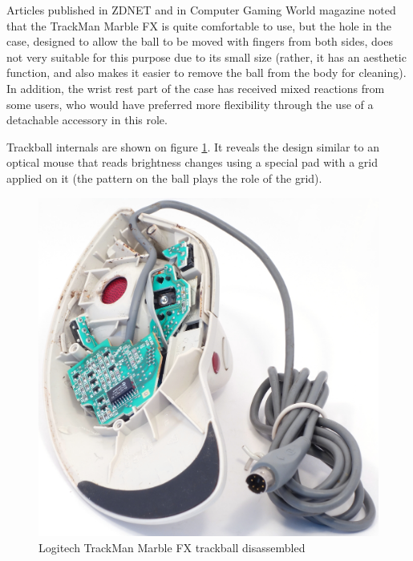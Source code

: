 \documentclass[11pt, a4paper]{article}
\begin{document}
Articles published in ZDNET \cite{zdnet} and in Computer Gaming World magazine \cite{gaming} noted that the TrackMan Marble FX is quite comfortable to use, but the hole in the case, designed to allow the ball to be moved with fingers from both sides, does not very suitable for this purpose due to its small size (rather, it has an aesthetic function, and also makes it easier to remove the ball from the body for cleaning). In addition, the wrist rest part of the case has received mixed reactions from some users, who would have preferred more flexibility through the use of a detachable accessory in this role.

Trackball internals are shown on figure \ref{fig:trackmanInside}. It reveals the design similar to an optical mouse that reads brightness changes using a special pad with a grid applied on it (the pattern on the ball plays the role of the grid).

\begin{figure}[h]
    \centering
    \includegraphics[scale=0.6]{1998_logitech_trackman_marble_fx/inside_30.jpg}
    \caption{Logitech TrackMan Marble FX trackball disassembled}
    \label{fig:trackmanInside}
\end{figure}
\end{document}
